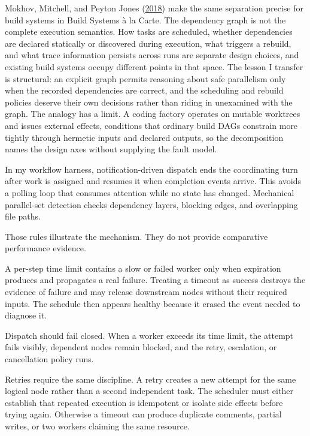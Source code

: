 Mokhov, Mitchell, and Peyton Jones (\href{https://www.microsoft.com/en-us/research/wp-content/uploads/2018/03/build-systems-final.pdf}{2018}) make the same separation precise for build systems in Build Systems à la Carte. The dependency graph is not the complete execution semantics. How tasks are scheduled, whether dependencies are declared statically or discovered during execution, what triggers a rebuild, and what trace information persists across runs are separate design choices, and existing build systems occupy different points in that space. The lesson I transfer is structural: an explicit graph permits reasoning about safe parallelism only when the recorded dependencies are correct, and the scheduling and rebuild policies deserve their own decisions rather than riding in unexamined with the graph. The analogy has a limit. A coding factory operates on mutable worktrees and issues external effects, conditions that ordinary build DAGs constrain more tightly through hermetic inputs and declared outputs, so the decomposition names the design axes without supplying the fault model.

In my workflow harness, notification-driven dispatch ends the coordinating turn after work is assigned and resumes it when completion events arrive. This avoids a polling loop that consumes attention while no state has changed. Mechanical parallel-set detection checks dependency layers, blocking edges, and overlapping file paths.

Those rules illustrate the mechanism. They do not provide comparative performance evidence.

A per-step time limit contains a slow or failed worker only when expiration produces and propagates a real failure. Treating a timeout as success destroys the evidence of failure and may release downstream nodes without their required inputs. The schedule then appears healthy because it erased the event needed to diagnose it.

Dispatch should fail closed. When a worker exceeds its time limit, the attempt fails visibly, dependent nodes remain blocked, and the retry, escalation, or cancellation policy runs.

Retries require the same discipline. A retry creates a new attempt for the same logical node rather than a second independent task. The scheduler must either establish that repeated execution is idempotent or isolate side effects before trying again. Otherwise a timeout can produce duplicate comments, partial writes, or two workers claiming the same resource.

